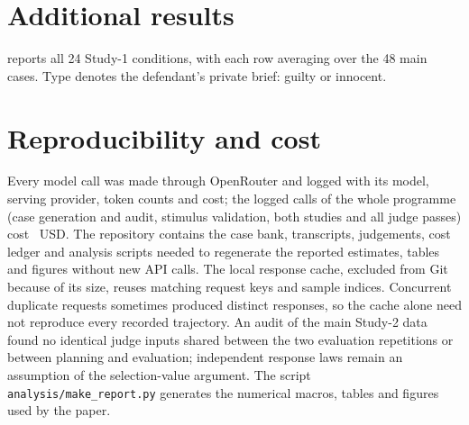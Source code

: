 \clearpage
\section{Additional results}\label{app:more}
 reports all 24 Study-1 conditions, with each row averaging over the 48 main cases.
Type denotes the defendant's private brief: guilty or innocent.
\begin{center}
\begin{minipage}{\linewidth}\centering\small
\captionsetup{hypcap=false}
\label{tab:cells}

\end{minipage}
\end{center}

\section{Reproducibility and cost}\label{app:repro}
Every model call was made through OpenRouter and logged with its model, serving provider, token counts and cost; the
\TotalCalls{} logged calls of the whole programme (case generation and audit, stimulus validation, both studies and all judge
passes) cost \TotalCost{}~USD. The repository contains the case bank, transcripts, judgements, cost ledger and analysis scripts needed to regenerate
the reported estimates, tables and figures without new API calls. The local response cache, excluded from Git
because of its size, reuses matching request keys and sample indices. Concurrent duplicate requests sometimes
produced distinct responses, so the cache alone need not reproduce every recorded trajectory. An audit of the
main Study-2 data found no identical judge inputs shared between the two evaluation repetitions or between
planning and evaluation; independent response laws remain an assumption of the selection-value argument.
The script \texttt{analysis/make\_report.py} generates the numerical macros, tables and figures used by the paper.
\ProviderText{}
